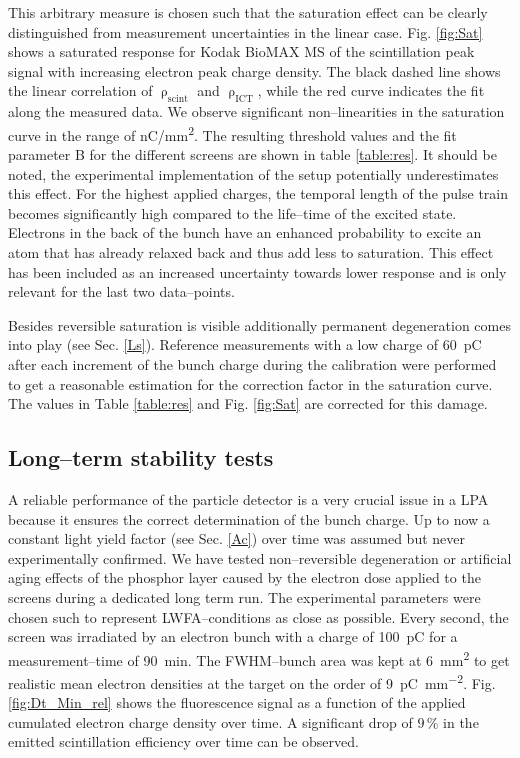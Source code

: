 \documentclass[%
reprint,
amsmath,
amssymb,
aip,
rsi, 
numerical,
floatfix,
]{revtex4-1}
\begin{document}
This arbitrary measure is chosen such that the saturation effect can be clearly distinguished from measurement uncertainties in the linear case. 
Fig. \ref{fig:Sat} shows a saturated response for Kodak BioMAX MS  of the scintillation peak signal with increasing electron peak charge density. 
The black dashed line shows the linear correlation of $\uprho_{\text{scint}}$ and $\uprho_{\text{ICT}}$, while the red curve indicates the fit along the measured data. 
We observe significant non--linearities in the saturation curve in the range of \si[per-mode=symbol]{\nano\coulomb \per \square\milli\meter}. 
The resulting threshold values and the fit parameter B for the different screens are shown in table \ref{table:res}.
It should be noted, the experimental implementation of the setup potentially underestimates this effect. 
For the highest applied charges, the temporal length of the pulse train becomes significantly high compared to the life--time of the excited state.
Electrons in the back of the bunch have an enhanced probability to excite an atom that has already relaxed back and thus add less to saturation.
This effect has been included as an increased uncertainty towards lower response and is only relevant for the last two data--points.
 
Besides reversible saturation is visible additionally permanent degeneration comes into play (see Sec. \ref{Ls}).
Reference measurements with a low charge of \SI{60}{\pico\coulomb} after each increment of the bunch charge during the calibration were performed to get a reasonable estimation for the correction factor in the saturation curve.
The values in Table \ref{table:res} and Fig. \ref{fig:Sat} are corrected for this damage.      

\subsection{\label{Ls}Long--term stability tests}
A reliable performance of the particle detector is a very crucial issue in a LPA because it ensures the correct determination of the bunch charge.
Up to now a constant light yield factor (see Sec. \ref{Ac}) over time was assumed but never experimentally confirmed. 
We have tested non--reversible degeneration or artificial aging effects of the phosphor layer caused by the electron dose applied to the screens during a dedicated long term run.
The experimental parameters were chosen such to represent LWFA--conditions as close as possible.
Every second, the screen was irradiated by an electron bunch with a charge of \SI{100}{\pico\coulomb} for a measurement--time of \SI{90}{\minute}.
The FWHM--bunch area was kept at \SI{6}{\square\milli\meter} to get realistic mean electron densities at the target on the order of \SI[per-mode=symbol]{9}{\pico\coulomb \per \square\milli\meter}. 
Fig. \ref{fig:Dt_Min_rel} shows the fluorescence signal as a function of the applied cumulated electron charge density over time. 
A significant drop of $9\,\%$ in the emitted scintillation efficiency over time can be observed.
 
\end{document}
